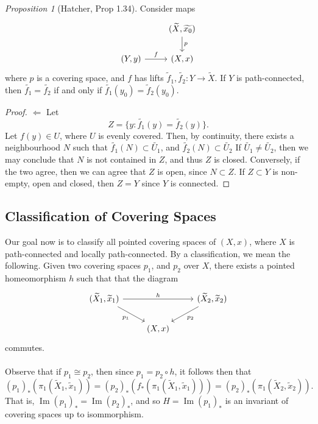 \documentclass[a4paper]{report}
\theoremstyle{definition}
\theoremstyle{remark}
\theoremstyle{proposition}
\newtheorem{proposition}{Proposition}
\theoremstyle{conjecture}
\theoremstyle{lemma}
\theoremstyle{corollary}
\theoremstyle{exercise}
\newcommand{\on}{\operatorname}
\begin{document}
\begin{proposition}[Hatcher, Prop 1.34]
    Consider maps 
    $$\begin{tikzcd}
        & {(\widetilde{X}, \widetilde{x_0})} \arrow[d, "p"] \\
{(Y,y)} \arrow[r, "f"] & {(X,x)}                                          
    \end{tikzcd}$$
    where $p$ is a covering space, and $f$ has lifts 
    $\widetilde{f}_1, \widetilde{f_2} : Y \to \widetilde{X}$.
    If $Y$ is path-connected, then $\widetilde{f_1} = \widetilde{f_2}$ 
    if and only if $\widetilde{f_1}(y_0) = \widetilde{f}_2(y_0)$.
\end{proposition}

\begin{proof}
    $\Longleftarrow$ Let 
    $$Z = \lbrace y : \widetilde{f_1}(y) = \widetilde{f_2}(y)\rbrace.$$
    Let $f(y) \in U$, where $U$ is evenly covered. Then, by continuity, there 
    exists a neighbourhood $N$ such that 
    $\widetilde{f_1}(N) \subset \widetilde{U_1}$, and $\widetilde{f_2}(N) \subset \widetilde{U_2}$
    If $\widetilde{U_1} \neq \widetilde{U_2}$, then we may conclude that 
    $N$ is not contained in $Z$, and thus $Z$ is closed. Conversely, if the two 
    agree, then we can agree that $Z$ is open, since $N \subset Z$. 
    If $Z \subset Y$ is non-empty, open and closed, then $Z=Y$ since $Y$ is 
    connected.
\end{proof}

\subsection{Classification of Covering Spaces}

Our goal now is to classify all pointed covering spaces of $(X,x)$, where 
$X$ is path-connected and locally path-connected. By a classification, we 
mean the following. Given two covering spaces $p_1$, and $p_2$ over $X$, 
there exists a pointed homeomorphism $h$ such that that the diagram
$$\begin{tikzcd}
    {(\widetilde{X}_1,\widetilde{x}_1)} \arrow[rd, "p_1"'] \arrow[rr, "h"] &         & {(\widetilde{X}_2,\widetilde{x}_2)} \arrow[ld, "p_2"] \\
                                                                           & {(X,x)} &                                                      
\end{tikzcd}$$ commutes.\\\\
Observe that if $p_1 \cong p_2$, then since $p_1 = p_2 \circ h$, 
it follows then that 
$$(p_1)_\ast (\pi_1(\widetilde{X}_1,\widetilde{x}_1)) = (p_2)_\ast (f_\ast (\pi_1(\widetilde{X}_1, \widetilde{x}_1))) = (p_2)_\ast (\pi_1(\widetilde{X}_2,\widetilde{x}_2)).$$
That is, $\on{Im}(p_1)_\ast = \on{Im}(p_2)_\ast$, and so $H = \on{Im}(p_1)_\ast$ is an invariant 
of covering spaces up to isommorphism.
\end{document}
